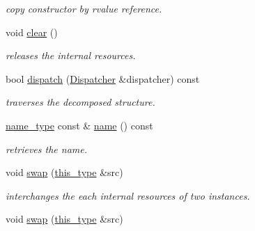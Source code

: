 \begin{DoxyCompactItemize}
\begin{DoxyCompactList}\small\item\em copy constructor by rvalue reference. \end{DoxyCompactList}\item 
\hypertarget{classhryky_1_1reduction_1_1_address_a82d4423d13abd528e6973809685c3e88}{void \hyperlink{classhryky_1_1reduction_1_1_address_a82d4423d13abd528e6973809685c3e88}{clear} ()}\label{classhryky_1_1reduction_1_1_address_a82d4423d13abd528e6973809685c3e88}

\begin{DoxyCompactList}\small\item\em releases the internal resources. \end{DoxyCompactList}\item 
bool \hyperlink{classhryky_1_1reduction_1_1_base_a71b31d4d0ed915254e2cb1ef217f28c4}{dispatch} (\hyperlink{classhryky_1_1reduction_1_1_dispatcher}{Dispatcher} \&dispatcher) const 
\begin{DoxyCompactList}\small\item\em traverses the decomposed structure. \end{DoxyCompactList}\item 
\hypertarget{classhryky_1_1reduction_1_1_base_a842569265d741905eb8a353d3935f1d1}{\hyperlink{namespacehryky_1_1reduction_ac686c30a4c8d196bbd0f05629a6b921f}{name\-\_\-type} const \& \hyperlink{classhryky_1_1reduction_1_1_base_a842569265d741905eb8a353d3935f1d1}{name} () const }\label{classhryky_1_1reduction_1_1_base_a842569265d741905eb8a353d3935f1d1}

\begin{DoxyCompactList}\small\item\em retrieves the name. \end{DoxyCompactList}\item 
\hypertarget{classhryky_1_1reduction_1_1_address_a9a81748e39ea5ae0cd1350c596544a50}{void \hyperlink{classhryky_1_1reduction_1_1_address_a9a81748e39ea5ae0cd1350c596544a50}{swap} (\hyperlink{classhryky_1_1reduction_1_1_address_aab723227e4610c73cfa610169d14ad54}{this\-\_\-type} \&src)}\label{classhryky_1_1reduction_1_1_address_a9a81748e39ea5ae0cd1350c596544a50}

\begin{DoxyCompactList}\small\item\em interchanges the each internal resources of two instances. \end{DoxyCompactList}\item 
\hypertarget{classhryky_1_1reduction_1_1_base_ab2b137d16fbe40d839ee136bd5304cab}{void \hyperlink{classhryky_1_1reduction_1_1_base_ab2b137d16fbe40d839ee136bd5304cab}{swap} (\hyperlink{classhryky_1_1reduction_1_1_address_aab723227e4610c73cfa610169d14ad54}{this\-\_\-type} \&src)}\label{classhryky_1_1reduction_1_1_base_ab2b137d16fbe40d839ee136bd5304cab}


\end{DoxyCompactItemize}
